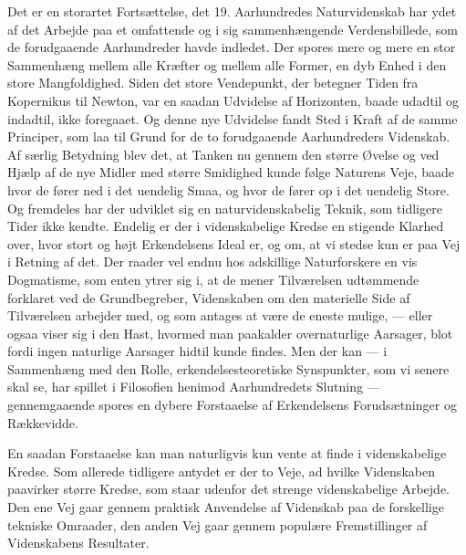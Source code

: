 \documentclass[12pt,a4paper,openany]{book}
\newcommand{\opage}[1]{\marginnote{\footnotesize\textit{[#1]}}}
\begin{document}
\opage{42}Det er en storartet Fortsættelse, det 19. Aarhundredes Naturvidenskab
har ydet af det Arbejde paa et omfattende og i sig sammenhængende
Verdensbillede, som de forudgaaende Aarhundreder
havde indledet. Der spores mere og mere en stor Sammenhæng mellem
alle Kræfter og mellem alle Former, en dyb Enhed i den store
Mangfoldighed. Siden det store Vendepunkt, der betegner Tiden fra
Kopernikus til Newton, var en saadan Udvidelse af Horizonten,
baade udadtil og indadtil, ikke foregaaet. Og denne nye Udvidelse
fandt Sted i Kraft af de samme Principer, som laa til Grund for de
to forudgaaende Aarhundreders Videnskab. Af særlig Betydning blev
det, at Tanken nu gennem den større Øvelse og ved Hjælp af de
nye Midler med større Smidighed kunde følge Naturens Veje, baade
hvor de fører ned i det uendelig Smaa, og hvor de fører op i det
uendelig Store. Og fremdeles har der udviklet sig en naturvidenskabelig
Teknik, som tidligere Tider ikke kendte. Endelig er der i
videnskabelige Kredse en stigende Klarhed over, hvor stort og højt
Erkendelsens Ideal er, og om, at vi stedse kun er paa Vej i Retning
af det. Der raader vel endnu hos adskillige Naturforskere en vis
Dogmatisme, som enten ytrer sig i, at de mener Tilværelsen udtømmende
forklaret ved de Grundbegreber, Videnskaben om den materielle
Side af Tilværelsen arbejder med, og som antages at være de
eneste mulige, --- eller ogsaa viser sig i den Hast, hvormed man
paakalder overnaturlige Aarsager, blot fordi ingen naturlige Aarsager
hidtil kunde findes. Men der kan --- i Sammenhæng med den
Rolle, erkendelsesteoretiske Synspunkter, som vi senere skal se, har
spillet i Filosofien henimod Aarhundredets Slutning --- gennemgaaende
spores en dybere Forstaaelse af Erkendelsens Forudsætninger
og Rækkevidde.

En saadan Forstaaelse kan man naturligvis kun vente at finde i
videnskabelige Kredse. Som allerede tidligere antydet er der to Veje,
ad hvilke Videnskaben paavirker større Kredse, som staar udenfor
det strenge videnskabelige Arbejde. Den ene Vej gaar gennem praktisk
Anvendelse af Videnskab paa de forskellige tekniske Omraader,
den anden Vej gaar gennem populære Fremstillinger af Videnskabens
Resultater.
\end{document}
